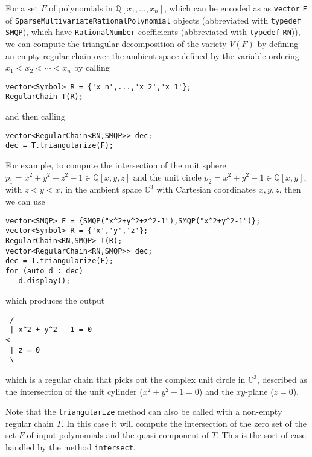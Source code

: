 For a set $F$ of polynomials in $\mathbb{Q}[x_1,\ldots,x_n]$, which can be encoded as as \texttt{vector} \texttt{F} of \texttt{SparseMultivariateRationalPolynomial} objects (abbreviated with \texttt{type\-def} \texttt{SMQP}), which have \texttt{RationalNumber} coefficients (abbreviated with \texttt{typedef} \texttt{RN})), we can compute the triangular decomposition of the variety $V(F)$ by defining an empty regular chain over the ambient space defined by the variable ordering $x_1<x_2<\cdots<x_n$  by calling
\begin{verbatim}
vector<Symbol> R = {'x_n',...,'x_2','x_1'};
RegularChain T(R);
\end{verbatim}
and then calling
\begin{verbatim}
vector<RegularChain<RN,SMQP>> dec;
dec = T.triangularize(F);
\end{verbatim}
For example, to compute the intersection of the unit sphere $p_1=x^2+y^2+z^2-1\in\mathbb{Q}[x,y,z]$ and the unit circle $p_2=x^2+y^2-1\in\mathbb{Q}[x,y]$, with $z<y<x$, in the ambient space $\mathbb{C}^3$ with Cartesian coordinates $x,y,z$, then we can use
\begin{verbatim}
vector<SMQP> F = {SMQP("x^2+y^2+z^2-1"),SMQP("x^2+y^2-1")};
vector<Symbol> R = {'x','y','z'};
RegularChain<RN,SMQP> T(R);
vector<RegularChain<RN,SMQP>> dec;
dec = T.triangularize(F);
for (auto d : dec)
   d.display();
\end{verbatim}
which produces the output
\begin{verbatim}
 /
 | x^2 + y^2 - 1 = 0
< 
 | z = 0
 \ 
\end{verbatim}
which is a regular chain that picks out the complex unit circle in $\mathbb{C}^3$, described as the intersection of the unit cylinder ($x^2 + y^2 - 1 = 0$) and the $xy$-plane ($z = 0$).

Note that the \texttt{triangularize} method can also be called with a non-empty regular chain $T$. In this case it will compute the intersection of the zero set of the set $F$ of input polynomials and the quasi-component of $T$. This is the sort of case handled by the method \texttt{intersect}.

